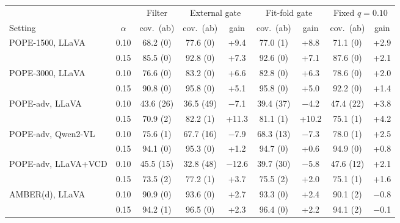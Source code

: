 \begin{tabular}{lcccccccc}
\toprule
 & & Filter & \multicolumn{2}{c}{External gate} & \multicolumn{2}{c}{Fit-fold gate} & \multicolumn{2}{c}{Fixed $q{=}0.10$}\\
\cmidrule(lr){4-5}\cmidrule(lr){6-7}\cmidrule(lr){8-9}
Setting & $\alpha$ & cov.\ (ab) & cov.\ (ab) & gain & cov.\ (ab) & gain & cov.\ (ab) & gain\\
\midrule
POPE-1500, LLaVA & 0.10 & 68.2 (0) & 77.6 (0) & +9.4 & 77.0 (1) & +8.8 & 71.1 (0) & +2.9\\
 & 0.15 & 85.5 (0) & 92.8 (0) & +7.3 & 92.6 (0) & +7.1 & 87.6 (0) & +2.1\\
\addlinespace
POPE-3000, LLaVA & 0.10 & 76.6 (0) & 83.2 (0) & +6.6 & 82.8 (0) & +6.3 & 78.6 (0) & +2.0\\
 & 0.15 & 90.8 (0) & 95.8 (0) & +5.1 & 95.8 (0) & +5.0 & 92.2 (0) & +1.4\\
\addlinespace
POPE-adv, LLaVA & 0.10 & 43.6 (26) & 36.5 (49) & $-$7.1 & 39.4 (37) & $-$4.2 & 47.4 (22) & +3.8\\
 & 0.15 & 70.9 (2) & 82.2 (1) & +11.3 & 81.1 (1) & +10.2 & 75.1 (1) & +4.2\\
\addlinespace
POPE-adv, Qwen2-VL & 0.10 & 75.6 (1) & 67.7 (16) & $-$7.9 & 68.3 (13) & $-$7.3 & 78.0 (1) & +2.5\\
 & 0.15 & 94.1 (0) & 95.3 (0) & +1.2 & 94.7 (0) & +0.6 & 94.9 (0) & +0.8\\
\addlinespace
POPE-adv, LLaVA+VCD & 0.10 & 45.5 (15) & 32.8 (48) & $-$12.6 & 39.7 (30) & $-$5.8 & 47.6 (12) & +2.1\\
 & 0.15 & 73.5 (2) & 77.2 (1) & +3.7 & 75.5 (2) & +2.0 & 75.1 (1) & +1.6\\
\addlinespace
AMBER(d), LLaVA & 0.10 & 90.9 (0) & 93.6 (0) & +2.7 & 93.3 (0) & +2.4 & 90.1 (2) & $-$0.8\\
 & 0.15 & 94.2 (1) & 96.5 (0) & +2.3 & 96.4 (0) & +2.2 & 94.1 (2) & $-$0.1\\
\bottomrule
\end{tabular}
